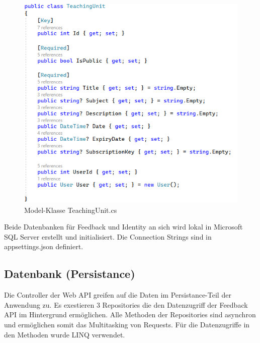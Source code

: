 \begin{figure}[h]
    \begin{center}
        \includegraphics[width=12cm]{./pics/Persistance/TeachingUnitModelEfCore.png}
    \caption[TeachingUnitModel]{Model-Klasse TeachingUnit.cs}
    \end{center}
\end{figure}

Beide Datenbanken für Feedback und Identity an sich wird lokal in Microsoft SQL Server erstellt und initialisiert. 
Die Connection Strings sind in appsettings.json definiert.

\newpage
\subsection{Datenbank (Persistance)}
\author{Stefano Pyringer}
Die Controller der Web API greifen auf die Daten im Persistance-Teil der Anwendung zu. Es exestieren 3 Repositories 
die den Datenzugriff der Feedback API im Hintergrund ermöglichen. Alle Methoden der Repositories sind asynchron und 
ermöglichen somit das Multitasking von Requests. Für die Datenzugriffe in den Methoden wurde LINQ verwendet.

